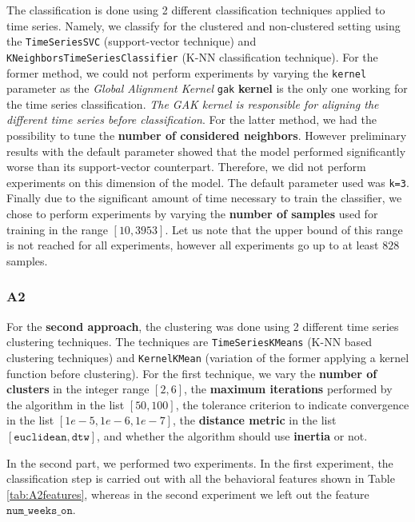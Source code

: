 \documentclass[sigplan,screen]{acmart}
\begin{document}
The classification is done using 2 different classification techniques applied to time series. Namely, we classify for the clustered and non-clustered setting using the \texttt{TimeSeriesSVC} (support-vector technique) and \\ \texttt{KNeighborsTimeSeriesClassifier} (K-NN classification technique). For the former method, we could not perform experiments by varying the \texttt{kernel} parameter as the \textit{Global Alignment Kernel} \texttt{gak} \textbf{kernel} is the only one working for the time series classification. \textit{The GAK kernel is responsible for aligning the different time series before classification}. For the latter method, we had the possibility to tune the \textbf{number of considered neighbors}. However preliminary results with the default parameter showed that the model performed significantly worse than its support-vector counterpart. Therefore, we did not perform experiments on this dimension of the model. The default parameter used was \texttt{k=3}. Finally due to the significant amount of time necessary to train the classifier, we chose to perform experiments by varying the \textbf{number of samples} used for training in the range $[10, 3953]$. Let us note that the upper bound of this range is not reached for all experiments, however all experiments go up to at least $828$ samples.

\subsubsection{A2}
For the \textbf{second approach}, the clustering was done using 2 different time series clustering techniques. The techniques are \texttt{TimeSeriesKMeans} (K-NN based clustering techniques) and \texttt{KernelKMean} (variation of the former applying a kernel function before clustering). For the first technique, we vary the \textbf{number of clusters} in the integer range $[2, 6]$, the \textbf{maximum iterations} performed by the algorithm in the list $[50, 100]$, the tolerance criterion to indicate convergence in the list $[1e-5, 1e-6, 1e-7]$, the \textbf{distance metric} in the list $[\texttt{euclidean}, \texttt{dtw}]$, and whether the algorithm should use \textbf{inertia} or not.

In the second part, we performed two experiments. In the first experiment, the classification step is carried out with all the behavioral features shown in Table \ref{tab:A2features}, whereas in the second experiment we left out the feature $\texttt{num\_weeks\_on}$.
\end{document}
